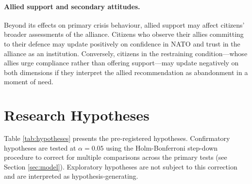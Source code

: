 \paragraph{Allied support and secondary attitudes.}
Beyond its effects on primary crisis behaviour, allied support may affect citizens' broader assessments of the alliance. Citizens who observe their allies committing to their defence may update positively on confidence in NATO and trust in the alliance as an institution. Conversely, citizens in the restraining condition---whose allies urge compliance rather than offering support---may update negatively on both dimensions if they interpret the allied recommendation as abandonment in a moment of need.


\section{Research Hypotheses}

Table \ref{tab:hypotheses} presents the pre-registered hypotheses. Confirmatory hypotheses are tested at $\alpha = 0.05$ using the Holm-Bonferroni step-down procedure to correct for multiple comparisons across the primary tests (see Section \ref{sec:model}). Exploratory hypotheses are not subject to this correction and are interpreted as hypothesis-generating.

